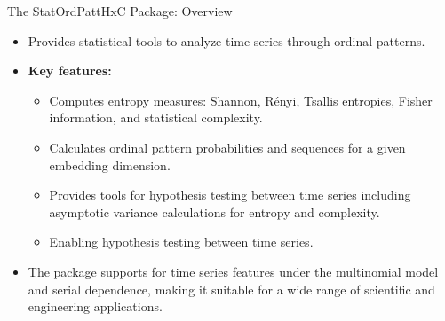 \documentclass{beamer}
\begin{document}




\begin{frame}{The StatOrdPattHxC Package: Overview}
	\begin{itemize}
		\item Provides statistical tools to analyze time series through ordinal patterns.
		\item \textbf{Key features:}
		\begin{itemize}
			\item Computes entropy measures: Shannon, Rényi, Tsallis entropies, Fisher information, and statistical complexity.
			\item Calculates ordinal pattern probabilities and sequences for a given embedding dimension.
			\item Provides tools for hypothesis testing between time series including asymptotic variance calculations for entropy and complexity.
			\item Enabling hypothesis testing between time series.
		\end{itemize}
		\item The package supports for time series features under the multinomial model and serial dependence, making it suitable for a wide range of scientific and engineering applications.
	\end{itemize}
\end{frame}
\end{document}
